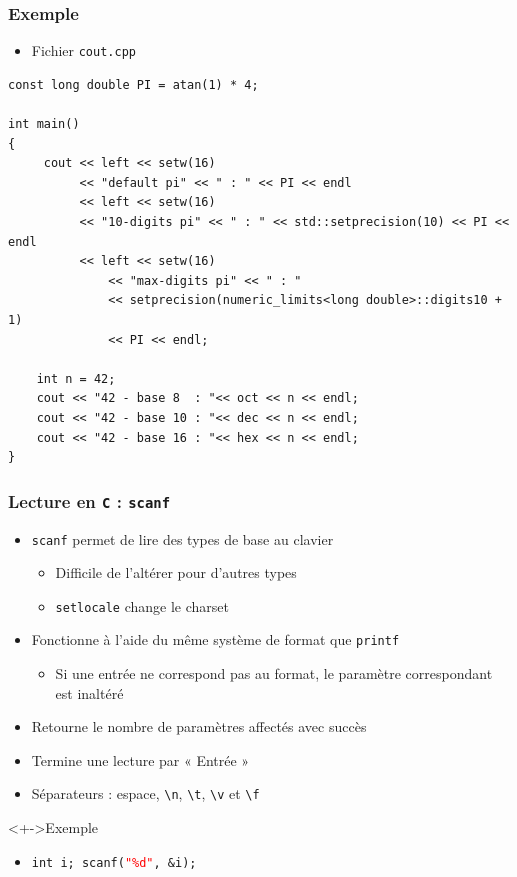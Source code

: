 \begin{frame}[containsverbatim]
\frametitle{Exemple}
\begin{itemize}
\item Fichier \texttt{cout.cpp}
\end{itemize}
\begin{lstlisting}
const long double PI = atan(1) * 4;

int main()
{
	 cout << left << setw(16)
	      << "default pi" << " : " << PI << endl
	      << left << setw(16) 
	      << "10-digits pi" << " : " << std::setprecision(10) << PI << endl
	      << left << setw(16)
              << "max-digits pi" << " : " 
              << setprecision(numeric_limits<long double>::digits10 + 1)
              << PI << endl;
 
	int n = 42;
	cout << "42 - base 8  : "<< oct << n << endl;
	cout << "42 - base 10 : "<< dec << n << endl;
	cout << "42 - base 16 : "<< hex << n << endl;                  
}
\end{lstlisting}
\end{frame}

\begin{frame}
\frametitle{Lecture en \texttt{C} : \texttt{scanf}}
\begin{itemize}[<+->]
\item \texttt{scanf} permet de lire des types de base au clavier
	\begin{itemize}
	\item Difficile de l'altérer pour d'autres types
	\item \texttt{setlocale} change le charset	
	\end{itemize}
\item Fonctionne à l'aide du même système de format que \texttt{printf}
	\begin{itemize}
	\item Si une entrée ne correspond pas au format, le paramètre correspondant est inaltéré	
	\end{itemize}
\item Retourne le nombre de paramètres affectés avec succès
\item Termine une lecture par « Entrée »
\item Séparateurs : espace, \texttt{\textbackslash{}n}, \texttt{\textbackslash{}t}, \texttt{\textbackslash{}v} et \texttt{\textbackslash{}f}
\end{itemize}
\begin{exampleblock}<+->{Exemple}
	\begin{itemize}[<+->]
	\item \texttt{\textcolor{blue!60}{int} i; scanf(\textcolor{red}{"\%d"}, \&i);} %
	\end{itemize}
\end{exampleblock}
\end{frame}

